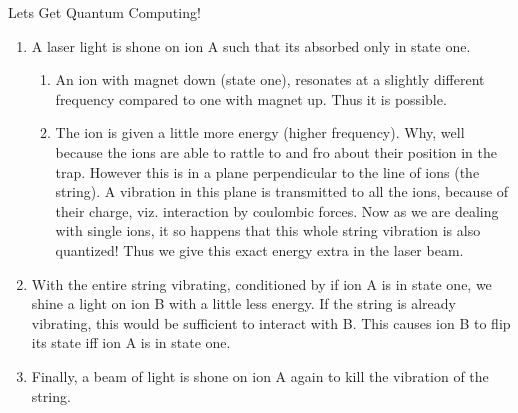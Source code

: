 \documentclass[final,hyperref={pdfpagelabels=false}]{beamer}
\begin{document}
\begin{frame}[t]
\begin{columns}[t]
\begin{column}{.465\textwidth}
\begin{block}{Lets Get Quantum Computing!}
\begin{enumerate}
	\begin{enumerate}
		\item A laser light is shone on ion A such that its absorbed only in state
		one.
		\begin{enumerate}
			\item An ion with magnet down (state one), resonates at a slightly different frequency
			compared to one with magnet up. Thus it is possible.
			\item The ion is given a little more energy (higher frequency). Why, well
			because the ions are able to rattle to and fro about their position in the
			trap. However this is in a plane perpendicular to the line of ions
			(the string). A vibration in this plane is transmitted to all the
			ions, because of their charge, viz. interaction by coulombic forces.
			Now as we are dealing with single ions, it so happens that this whole
			string vibration is also quantized! Thus we give this exact energy
			extra in the laser beam.
		\end{enumerate}
		\item With the entire string vibrating, conditioned by if ion A is in state
		one, we shine a light on ion B with a little less energy. If the string
		is already vibrating, this would be sufficient to interact with B.
		This causes ion B to flip its state iff ion A is in state one.
		\item Finally, a beam of light is shone on ion A again to kill the vibration
		of the string.
	\end{enumerate}
\end{enumerate}






\end{block}
\end{column}
\end{columns}
\end{frame}
\end{document}
